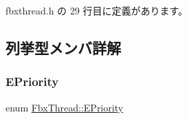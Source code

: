  fbxthread.\+h の 29 行目に定義があります。



\subsection{列挙型メンバ詳解}
\mbox{\label{class_fbx_thread_a1b7d46235dd8589e03f7a29777f083f2}} 
\subsubsection{\texorpdfstring{E\+Priority}{EPriority}}
{\footnotesize\ttfamily enum \hyperlink{class_fbx_thread_a1b7d46235dd8589e03f7a29777f083f2}{Fbx\+Thread\+::\+E\+Priority}}

